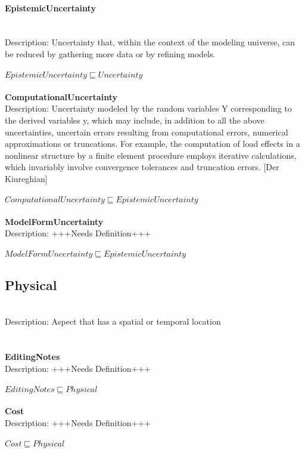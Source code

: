 \paragraph{EpistemicUncertainty}\\
Description: Uncertainty that, within the context of the modeling universe, can be reduced by gathering more data or by refining models. \cite{Kiureghian2008}\\
\\$ EpistemicUncertainty \sqsubseteq Uncertainty$
\\\\   \textbf{ComputationalUncertainty}\\Description: Uncertainty modeled by the random variables Y corresponding to the derived variables y, which may include, in addition to all the above uncertainties, uncertain errors resulting from computational errors, numerical approximations or truncations. For example, the computation of load effects in a nonlinear structure by a finite element procedure employs iterative calculations, which invariably involve convergence tolerances and truncation errors. [Der Kiureghian]\\
\\$ ComputationalUncertainty \sqsubseteq EpistemicUncertainty$
\\\\   \textbf{ModelFormUncertainty}\\Description: +++Needs Definition+++\\
\\$ ModelFormUncertainty \sqsubseteq EpistemicUncertainty$
\subsection{Physical}\\
Description: Aspect that has a spatial or temporal location \cite{Pease2011}\\
\\\\   \textbf{EditingNotes}\\Description: +++Needs Definition+++\\
\\$ EditingNotes \sqsubseteq Physical$
\\\\   \textbf{Cost}\\Description: +++Needs Definition+++\\
\\$ Cost \sqsubseteq Physical$
